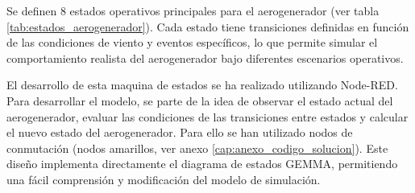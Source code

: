 Se definen 8 estados operativos principales para el aerogenerador (ver tabla \ref{tab:estados_aerogenerador}). Cada estado tiene transiciones definidas en función de las condiciones de viento y eventos específicos, lo que permite simular el comportamiento realista del aerogenerador bajo diferentes escenarios operativos.\par
\begin{table}[tbp]
    \centering
    \caption{Definición de los estados operativos del aerogenerador en el sistema SCADA.}
    \label{tab:estados_aerogenerador}
\end{table}
El desarrollo de esta maquina de estados se ha realizado utilizando Node-RED. Para desarrollar el modelo, se parte de la idea de observar el estado actual del aerogenerador, evaluar las condiciones de las transiciones entre estados y calcular el nuevo estado del aerogenerador. Para ello se han utilizado nodos de conmutación (nodos amarillos, ver anexo \ref{cap:anexo_codigo_solucion}). Este diseño implementa directamente el diagrama de estados GEMMA, permitiendo una fácil comprensión y modificación del modelo de simulación. \par
